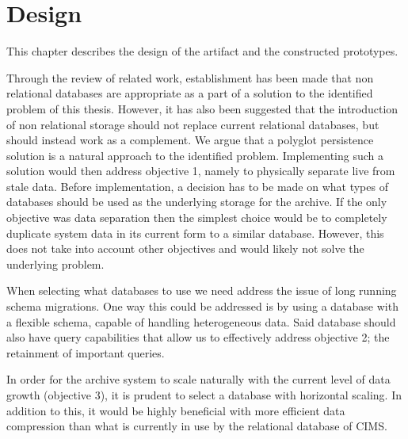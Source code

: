 \chapter{Design}
\label{chap:design}


This chapter describes the design of the artifact and the constructed prototypes.

Through the review of related work, establishment has been made that non relational databases are appropriate as a part of a solution to the identified problem of this thesis. However, it has also been suggested \cite{NoSQLSurvey} that the introduction of non relational storage should not replace current relational databases, but should instead work as a complement. We argue that a polyglot persistence solution is a natural approach to the identified problem. Implementing such a solution would then address objective 1, namely to physically separate live from stale data. Before implementation, a decision has to be made on what types of databases should be used as the underlying storage for the archive. If the only objective was data separation then the simplest choice would be to completely duplicate system data in its current form to a similar database. However, this does not take into account other objectives and would likely not solve the underlying problem. 

When selecting what databases to use we need address the issue of long running schema migrations. One way this could be addressed is by using a database with a flexible schema, capable of handling heterogeneous data. Said database should also have query capabilities that allow us to effectively address objective 2; the retainment of important queries.

In order for the archive system to scale naturally with the current level of data growth (objective 3), it is prudent to select a database with horizontal scaling. In addition to this, it would be highly beneficial with more efficient data compression than what is currently in use by the relational database of CIMS.


